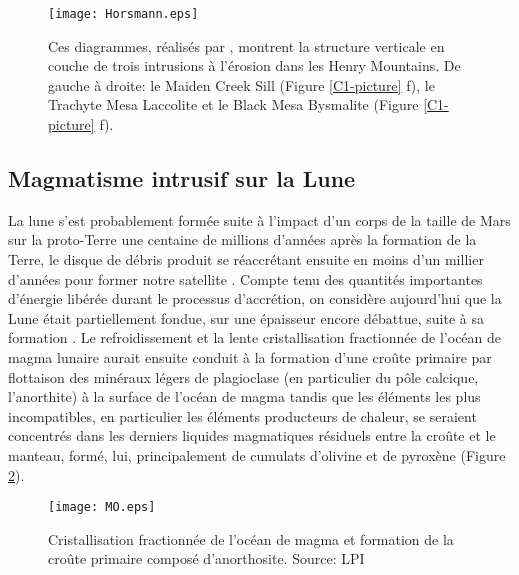\begin{figure}[htpb]
  \begin{center}
    \graphicspath{ {/Users/thorey/Documents/These/Manuscript/Figure/Chapter1/} }
    \texttt{[image: Horsmann.eps]}
    \caption{Ces  diagrammes,  réalisés  par  \citet{Horsman:2009gea},
      montrent la structure verticale en  couche de trois intrusions à
      l'érosion  dans les  Henry  Mountains. De  gauche  à droite:  le
      Maiden Creek Sill (Figure  \ref{C1-picture} f), le Trachyte Mesa
      Laccolite et  le Black  Mesa Bysmalite  (Figure \ref{C1-picture}
      f).}
    \label{C1-Horsmann}
  \end{center}
\end{figure}

\subsection{Magmatisme intrusif sur la Lune}
\label{C1-sec:moon}

La lune  s'est probablement formée suite  à l'impact d'un corps  de la
taille de  Mars sur la  proto-Terre une centaine de  millions d'années
après  la formation  de  la  Terre, le  disque  de  débris produit  se
réaccrétant ensuite en  moins d'un millier d'années  pour former notre
satellite
\citep{Mizutani:1972hc,Cameron:1991vu,Canup:2001eb,Canup:2012cd}.
Compte  tenu des  quantités  importantes d'énergie  libérée durant  le
processus  d'accrétion, on  considère  aujourd'hui que  la Lune  était
partiellement fondue,  sur une épaisseur  encore débattue, suite  à sa
formation \citep{ElkinsTanton:2011ce}.  Le refroidissement et la lente
cristallisation fractionnée de l'océan de magma lunaire aurait ensuite
conduit  à  la formation  d'une  croûte  primaire par  flottaison  des
minéraux  légers  de plagioclase  (en  particulier  du pôle  calcique,
l'anorthite) à la surface de l'océan  de magma tandis que les éléments
les  plus incompatibles,  en particulier  les éléments  producteurs de
chaleur, se seraient concentrés dans les derniers liquides magmatiques
résiduels entre la croûte et le manteau, formé, lui, principalement de
cumulats d'olivine et de pyroxène (Figure \ref{C1-MO}).

\begin{figure}[htpb]
  \begin{center}
    \graphicspath{ {/Users/thorey/Documents/These/Manuscript/Figure/Chapter1/} }
    \texttt{[image: MO.eps]}
    \caption{Cristallisation  fractionnée  de   l'océan  de  magma  et
      formation de  la croûte primaire composé  d'anorthosite. Source:
      LPI}
    \label{C1-MO}
  \end{center}
\end{figure}

